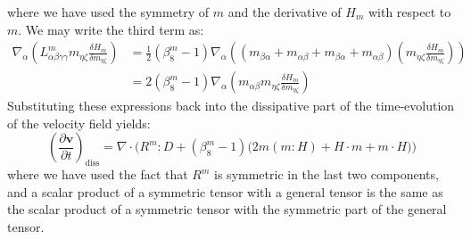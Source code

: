 \documentclass[reqno]{article}
\begin{document}
  where we have used the symmetry of $m$ and the derivative of $H_m$ with
  respect to $m$.
  We may write the third term as:
  \begin{equation}
    \begin{split}
      \nabla_\alpha \left( L^m_{\alpha \beta \gamma\gamma} m_{\eta\zeta} \frac{\delta H_m}{\delta m_{\eta\zeta}} \right)
      &=
      \tfrac12 \left( \beta^m_8 - 1 \right)
      \nabla_\alpha \left(
        \left( m_{\beta\alpha} + m_{\alpha\beta} + m_{\beta\alpha} + m_{\alpha\beta}\right)
        \left( m_{\eta\zeta} \frac{\delta H_m}{\delta m_{\eta\zeta}} \right)
      \right) \\
      &= 2 \left( \beta^m_8 - 1 \right)
      \nabla_\alpha \left(
        m_{\alpha\beta} m_{\eta\zeta} \frac{\delta H_m}{\delta m_{\eta\zeta}}
      \right)
    \end{split}
  \end{equation}
  Substituting these expressions back into the dissipative part of the
  time-evolution of the velocity field yields:
  \begin{equation}
    \left( \frac{\partial \mathbf{v}}{\partial t} \right)_\text{diss}
    =
    \nabla \cdot \biggl(
      R^m : D
      + \left( \beta^m_8 - 1 \right)
      \bigl(
        2 m (m : H)
        + H \cdot m + m \cdot H
      \bigr)
    \biggr)
  \end{equation}
  where we have used the fact that $R^m$ is symmetric in the last two
  components, and a scalar product of a symmetric tensor with a general tensor
  is the same as the scalar product of a symmetric tensor with the symmetric
  part of the general tensor.
\end{document}
